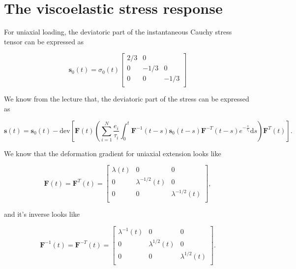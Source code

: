 \documentclass[12pt,a4paper]{article}
\begin{document}
\newpage

\section{The viscoelastic stress response}

For uniaxial loading, the deviatoric part of the instantaneous Cauchy stress tensor can be expressed as

\begin{equation}
    \boldsymbol{s}_0(t) = 
    \sigma_0(t)
    \begin{bmatrix}
        2/3 & 0 & \\
        0 & -1/3 & 0\\
        0 & 0 & -1/3\\
    \end{bmatrix}
\end{equation}


We know from the lecture that, the deviatoric part of the stress can be expressed as

\begin{equation}
\boldsymbol{s}(t) = \boldsymbol{s}_0(t) - 
\text{dev}\left[
    \boldsymbol{F}(t)
        \left(
            \sum_{i=1}^N \frac{e_i}{\tau_i} \int_0^t \boldsymbol{F}^{-1}(t-s) \boldsymbol{s}_0(t-s) \boldsymbol{F}^{-T}(t-s)e^{-\frac{s}{\tau_i}}\text{d}s
        \right)
    \boldsymbol{F}^T(t)
\right].
\end{equation}

We know that the deformation gradient for uniaxial extension looks like

\begin{equation}
\boldsymbol{F}(t) = \boldsymbol{F}^T(t) = 
\begin{bmatrix}
    \lambda(t) & 0 & 0\\
    0&\lambda^{-1/2}(t)&0\\
    0&0&\lambda^{-1/2}(t)\\
\end{bmatrix},
\end{equation}

and it's inverse looks like

\begin{equation}
\boldsymbol{F}^{-1}(t) =  \boldsymbol{F}^{-T}(t)=
\begin{bmatrix}
    \lambda^{-1}(t) & 0 & 0\\
    0&\lambda^{1/2}(t)&0\\
    0&0&\lambda^{1/2}(t)\\
\end{bmatrix}.
\end{equation}
\end{document}
